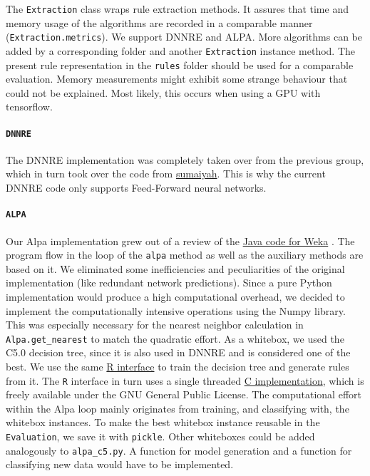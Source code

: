 \documentclass[
]{article}
\begin{document}
The \texttt{Extraction} class wraps rule extraction methods. It assures
that time and memory usage of the algorithms are recorded in a
comparable manner (\texttt{Extraction.metrics}). We support DNNRE and
ALPA. More algorithms can be added by a corresponding folder and another
\texttt{Extraction} instance method. The present rule representation in
the \texttt{rules} folder should be used for a comparable evaluation.
Memory measurements might exhibit some strange behaviour that could not
be explained. Most likely, this occurs when using a GPU with tensorflow.

\hypertarget{dnnre}{%
\paragraph{\texorpdfstring{\texttt{DNNRE}}{DNNRE}}\label{dnnre}}

The DNNRE implementation was completely taken over from the previous
group, which in turn took over the code from
\href{https://github.com/sumaiyah/DNN-RE/}{sumaiyah}. This is why the
current DNNRE code only supports Feed-Forward neural networks.

\hypertarget{alpa}{%
\paragraph{\texorpdfstring{\texttt{ALPA}}{ALPA}}\label{alpa}}

Our Alpa implementation grew out of a review of the
\href{https://www.uantwerpen.be/en/research-groups/applied-data-mining/software/\#ALPA}{Java
code for Weka} . The program flow in the loop of the \texttt{alpa}
method as well as the auxiliary methods are based on it. We eliminated
some inefficiencies and peculiarities of the original implementation
(like redundant network predictions). Since a pure Python implementation
would produce a high computational overhead, we decided to implement the
computationally intensive operations using the Numpy library. This was
especially necessary for the nearest neighbor calculation in
\texttt{Alpa.get\_nearest} to match the quadratic effort. As a whitebox,
we used the C5.0 decision tree, since it is also used in DNNRE and is
considered one of the best. We use the same
\href{https://cran.r-project.org/web/packages/C50/vignettes/C5.0.html}{R
interface} to train the decision tree and generate rules from it. The
\texttt{R} interface in turn uses a single threaded
\href{https://www.rulequest.com/see5-unix.html}{C implementation}, which
is freely available under the GNU General Public License. The
computational effort within the Alpa loop mainly originates from
training, and classifying with, the whitebox instances. To make the best
whitebox instance reusable in the \texttt{Evaluation}, we save it with
\texttt{pickle}. Other whiteboxes could be added analogously to
\texttt{alpa\_c5.py}. A function for model generation and a function for
classifying new data would have to be implemented.
\end{document}
